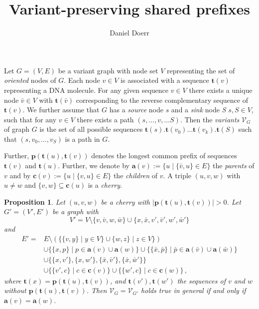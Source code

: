 \documentclass[a4paper]{article}
\title{Variant-preserving shared prefixes}
\author{Daniel Doerr}
\newtheorem{proposition}{Proposition}
\newcommand{\prefix}{\mathbf{p}}
\newcommand{\parent}{\mathbf{a}}
\newcommand{\child}{\mathbf{c}}
\newcommand{\seq}{\mathbf{t}}
\begin{document}
\maketitle

Let $G = (V, E)$ be a variant graph with node set $V$ representing the set of
\emph{oriented} nodes of $G$. Each node $v \in V$ is associated with a sequence
$\seq(v)$ representing a DNA molecule. For any given sequence $v \in V$ there exists
a unique node $\bar v \in V$ with $\seq(\bar v)$ corresponding to the 
reverse complementary sequence of $\seq(v)$. We further assume that $G$  has a
\emph{source} node $s$ and a \emph{sink} node \emph{S} $s, S \in V$, such that
for any $v \in V$ there exists a path $(s,\ldots, v, \ldots S)$. Then the
\emph{variants} $\mathcal V_G$ of graph $G$ is the set of all possible sequences
$\seq(s).\seq(v_0)\ldots\seq(v_k).\seq(S)$ such that $(s, v_0, \ldots, v_S)$ is
a path in $G$. 

Further, $\prefix(\seq(u), \seq(v))$ denotes the longest common prefix of
sequences $\seq(v)$ and $\seq(u)$. Further, we denote by $\parent(v) := \{u
\mid \{\bar v, u\} \in E\}$ the \emph{parents} of $v$ and by $\child(v) := \{u
\mid \{v, u\} \in E\}$ the \emph{children} of $v$. A triple $(u, v, w)$ with $u
\neq w$ and $\{v, w\} \subseteq\child(u)$ is a \emph{cherry}. 

\begin{proposition}
    Let $(u, v, w)$ be a cherry with $|\prefix(\seq(u), \seq(v))| > 0$. Let $G' =
    (V', E')$ be a graph with 
    \[
        V' = V \setminus \{v, \bar v, w, \bar w\} \cup \{x, \bar x, v', \bar
        v', w', \bar w'\}
    \]
    and 
    \begin{align*}
        E' = & E \setminus (\{\{v, y\} \mid y \in V\} \cup \{w, z\} \mid z \in
        V\}) \\
        & \cup \{\{x, p\} \mid p \in \parent(v) \cup \parent(w)\} \cup
        \{\{\bar x, \bar p \} \mid \bar p \in \parent(\bar v) \cup \parent(\bar
        w) \} \\
        & \cup \{\{x, v'\}, \{x, w'\}, \{\bar x, \bar v'\}, \{\bar x, \bar
        w'\}\} \\
        & \cup \{\{v', c\} \mid c \in \child(v) \} \cup \{\{w', c\} \mid c \in
        \child(w)\}\,,
    \end{align*}
    where $\seq(x) = \prefix(\seq(u), \seq(v))$, and $\seq(v'), \seq(w')$ the
    sequences of $v$ and $w$ without $\prefix(\seq(u), \seq(v))$. 
    Then $\mathcal V_G = \mathcal V_{G'}$ holds true in general if and only if
    $\parent(v) = \parent(w)$.
\end{proposition}
\end{document}
